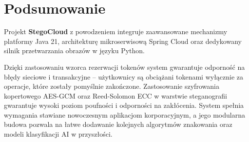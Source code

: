 \documentclass[12pt,a4paper]{article}
\begin{document}
\newpage

\section{Podsumowanie}
Projekt \textbf{StegoCloud} z powodzeniem integruje zaawansowane mechanizmy platformy Java 21, architekturę mikroserwisową Spring Cloud oraz dedykowany silnik przetwarzania obrazów w języku Python. 

Dzięki zastosowaniu wzorca rezerwacji tokenów system gwarantuje odporność na błędy sieciowe i transakcyjne -- użytkownicy są obciążani tokenami wyłącznie za operacje, które zostały pomyślnie zakończone. Zastosowanie szyfrowania kopertowego AES-GCM oraz Reed-Solomon ECC w warstwie steganografii gwarantuje wysoki poziom poufności i odporności na zakłócenia. System spełnia wymagania stawiane nowoczesnym aplikacjom korporacyjnym, a jego modularna budowa pozwala na łatwe dodawanie kolejnych algorytmów znakowania oraz modeli klasyfikacji AI w przyszłości.
\end{document}
